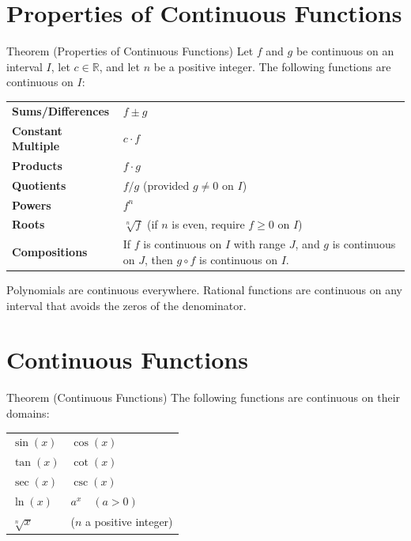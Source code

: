 \section*{Properties of Continuous Functions}

\begin{theorembox}{Theorem (Properties of Continuous Functions)}
Let $f$ and $g$ be continuous on an interval $I$, let $c \in \mathbb{R}$,
and let $n$ be a positive integer.
The following functions are continuous on $I$:

\medskip
\begin{tabular}{@{}p{}p{}@{}}
\textbf{Sums/Differences}  & $f \pm g$ \\[6pt]
\textbf{Constant Multiple} & $c \cdot f$ \\[6pt]
\textbf{Products}          & $f \cdot g$ \\[6pt]
\textbf{Quotients}         & $f/g$ \quad (provided $g \neq 0$ on $I$) \\[6pt]
\textbf{Powers}            & $f^n$ \\[6pt]
\textbf{Roots}             & $\sqrt[n]{f}$ \quad (if $n$ is even, require $f \geq 0$ on $I$) \\[6pt]
\textbf{Compositions}      & If $f$ is continuous on $I$ with range $J$, and $g$ is
                             continuous on $J$, then $g \circ f$ is continuous on $I$.
\end{tabular}
\end{theorembox}

\begin{remark*}
Polynomials are continuous everywhere.
Rational functions are continuous on any interval that avoids the
zeros of the denominator.
\end{remark*}

\section*{Continuous Functions}

\begin{theorembox}{Theorem (Continuous Functions)}
The following functions are continuous on their domains:

\medskip
\begin{tabular}{@{}p{}p{}@{}}
$\sin(x)$     & $\cos(x)$           \\[4pt]
$\tan(x)$     & $\cot(x)$           \\[4pt]
$\sec(x)$     & $\csc(x)$           \\[4pt]
$\ln(x)$      & $a^x \quad (a > 0)$ \\[4pt]
$\sqrt[n]{x}$ & ($n$ a positive integer) \\
\end{tabular}
\end{theorembox}

